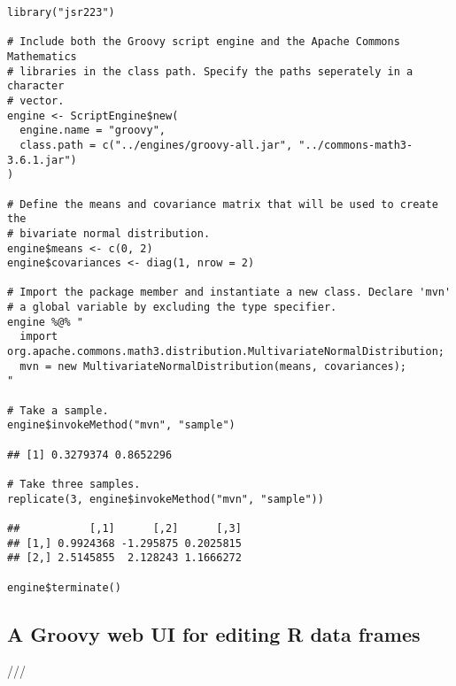 \begin{verbatim}
library("jsr223")

# Include both the Groovy script engine and the Apache Commons Mathematics 
# libraries in the class path. Specify the paths seperately in a character
# vector.
engine <- ScriptEngine$new(
  engine.name = "groovy",
  class.path = c("../engines/groovy-all.jar", "../commons-math3-3.6.1.jar")
)

# Define the means and covariance matrix that will be used to create the
# bivariate normal distribution.
engine$means <- c(0, 2)
engine$covariances <- diag(1, nrow = 2)

# Import the package member and instantiate a new class. Declare 'mvn'
# a global variable by excluding the type specifier.
engine %@% "
  import org.apache.commons.math3.distribution.MultivariateNormalDistribution;
  mvn = new MultivariateNormalDistribution(means, covariances);
"

# Take a sample.
engine$invokeMethod("mvn", "sample")

## [1] 0.3279374 0.8652296

# Take three samples.
replicate(3, engine$invokeMethod("mvn", "sample"))

##           [,1]      [,2]      [,3]
## [1,] 0.9924368 -1.295875 0.2025815
## [2,] 2.5145855  2.128243 1.1666272

engine$terminate()
\end{verbatim}

\subsection{A Groovy web UI for editing R data frames}

///




%
%
%
%
%

